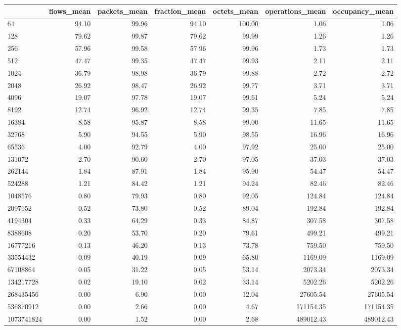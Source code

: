 \begin{tabular}{lrrrrrr}
\toprule
 & flows_mean & packets_mean & fraction_mean & octets_mean & operations_mean & occupancy_mean \\
\midrule
64 & 94.10 & 99.96 & 94.10 & 100.00 & 1.06 & 1.06 \\
128 & 79.62 & 99.87 & 79.62 & 99.99 & 1.26 & 1.26 \\
256 & 57.96 & 99.58 & 57.96 & 99.96 & 1.73 & 1.73 \\
512 & 47.47 & 99.35 & 47.47 & 99.93 & 2.11 & 2.11 \\
1024 & 36.79 & 98.98 & 36.79 & 99.88 & 2.72 & 2.72 \\
2048 & 26.92 & 98.47 & 26.92 & 99.77 & 3.71 & 3.71 \\
4096 & 19.07 & 97.78 & 19.07 & 99.61 & 5.24 & 5.24 \\
8192 & 12.74 & 96.92 & 12.74 & 99.35 & 7.85 & 7.85 \\
16384 & 8.58 & 95.87 & 8.58 & 99.00 & 11.65 & 11.65 \\
32768 & 5.90 & 94.55 & 5.90 & 98.55 & 16.96 & 16.96 \\
65536 & 4.00 & 92.79 & 4.00 & 97.92 & 25.00 & 25.00 \\
131072 & 2.70 & 90.60 & 2.70 & 97.05 & 37.03 & 37.03 \\
262144 & 1.84 & 87.91 & 1.84 & 95.90 & 54.47 & 54.47 \\
524288 & 1.21 & 84.42 & 1.21 & 94.24 & 82.46 & 82.46 \\
1048576 & 0.80 & 79.93 & 0.80 & 92.05 & 124.84 & 124.84 \\
2097152 & 0.52 & 73.80 & 0.52 & 89.04 & 192.84 & 192.84 \\
4194304 & 0.33 & 64.29 & 0.33 & 84.87 & 307.58 & 307.58 \\
8388608 & 0.20 & 53.70 & 0.20 & 79.61 & 499.21 & 499.21 \\
16777216 & 0.13 & 46.20 & 0.13 & 73.78 & 759.50 & 759.50 \\
33554432 & 0.09 & 40.19 & 0.09 & 65.80 & 1169.09 & 1169.09 \\
67108864 & 0.05 & 31.22 & 0.05 & 53.14 & 2073.34 & 2073.34 \\
134217728 & 0.02 & 19.10 & 0.02 & 33.14 & 5202.26 & 5202.26 \\
268435456 & 0.00 & 6.90 & 0.00 & 12.04 & 27605.54 & 27605.54 \\
536870912 & 0.00 & 2.66 & 0.00 & 4.67 & 171154.35 & 171154.35 \\
1073741824 & 0.00 & 1.52 & 0.00 & 2.68 & 489012.43 & 489012.43 \\
\bottomrule
\end{tabular}
